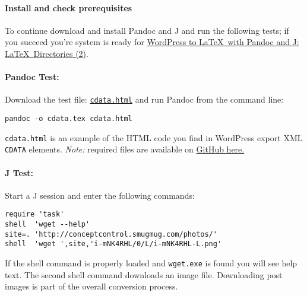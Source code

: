 \paragraph{Install and check prerequisites}

To continue download and install Pandoc and J and run the following
tests; if you succeed you're system is ready for
\href{http://bakerjd99.wordpress.com/2012/02/18/wordpress-to-latex-with-pandoc-and-j-latex-directories-part-2-2/}{WordPress
to \LaTeX\ with Pandoc and J: \LaTeX\ Directories (2)}.

\paragraph{Pandoc Test:} Download the test file: \href{https://github.com/bakerjd99/jacks/blob/master/texfrwpxml/cdata.html}{\texttt{cdata.html}} and run Pandoc from the
command line:

\begin{tcolorbox}[breakable, size=fbox, boxrule=1pt, pad at break*=1mm,colback=cellbackground, colframe=cellborder]
\begin{verbatim}
pandoc -o cdata.tex cdata.html
\end{verbatim}
\end{tcolorbox}

\noindent \texttt{cdata.html} is an example of the HTML code you find in WordPress
export XML \texttt{CDATA} elements. \emph{Note:} required files are 
available on \href{https://github.com/bakerjd99/jacks/tree/master/texfrwpxml}{GitHub here.}

\paragraph{J Test:} Start a J session and enter the following commands:
\begin{tcolorbox}[breakable, size=fbox, boxrule=1pt, pad at break*=1mm,colback=cellbackground, colframe=cellborder]
\begin{lstlisting}[language=jdoc, frame=single,framerule=0pt,label=lst:scr2374x0]
require 'task'
shell  'wget --help'
site=. 'http://conceptcontrol.smugmug.com/photos/'
shell  'wget ',site,'i-mNK4RHL/0/L/i-mNK4RHL-L.png'
\end{lstlisting}
\end{tcolorbox}

\noindent If the shell command is properly loaded and \texttt{wget.exe} is found
you will see help text. The second shell command downloads an image
file. Downloading post images is part of the overall conversion process.




%